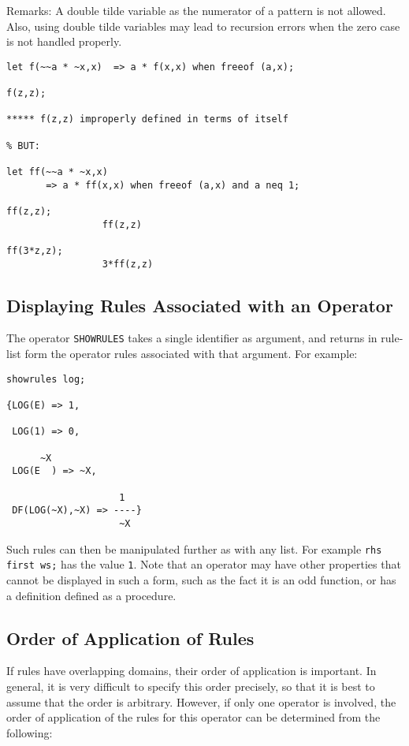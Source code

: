 \documentclass[11pt,letterpaper]{book}
\makeatletter
\newcommand{\underscore}{\_}
\newcommand{\ttindex}[1]{{\renewcommand{\_}{\protect\underscore}%
                          \index{#1@{\tt #1}}}}
\makeatother
\begin{document}
Remarks: A double tilde variable as the numerator of a pattern is not allowed.
Also, using double tilde variables may lead to recursion errors when the
zero case is not handled properly.
{\small\begin{verbatim}
let f(~~a * ~x,x)  => a * f(x,x) when freeof (a,x);

f(z,z);

***** f(z,z) improperly defined in terms of itself

% BUT:

let ff(~~a * ~x,x)
       => a * ff(x,x) when freeof (a,x) and a neq 1;

ff(z,z);
                 ff(z,z)

ff(3*z,z);
                 3*ff(z,z)
\end{verbatim}}

\subsection*{Displaying Rules Associated with an Operator}

The operator {\tt SHOWRULES}\ttindex{SHOWRULES} takes a single identifier
as argument, and returns in rule-list form the operator rules associated
with that argument.  For example:
{\small\begin{verbatim}
showrules log;

{LOG(E) => 1,

 LOG(1) => 0,

      ~X
 LOG(E  ) => ~X,

                    1
 DF(LOG(~X),~X) => ----}
                    ~X
\end{verbatim}}

Such rules can then be manipulated further as with any list.  For example
{\tt rhs first ws;} has the value {\tt 1}.  Note that an operator may
have other properties that cannot be displayed in such a form, such as the
fact it is an odd function, or has a definition defined as a procedure.

\subsection*{Order of Application of Rules}

If rules have overlapping domains, their order of application is
important.  In general, it is very difficult to specify this order
precisely, so that it is best to assume that the order is arbitrary.
However, if only one operator is involved, the order of application of the
rules for this operator can be determined from the following:
\end{document}
